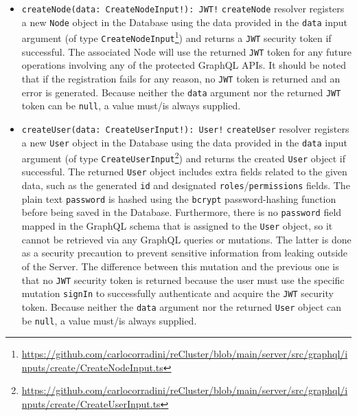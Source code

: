 \begin{itemize}
  \item \lstinline[language=graphql, morekeywords={[2]{CreateNodeInput, JWT}}, morekeywords={[4]{data}},
    morekeywords={[5]{createNode}}]{createNode(data: CreateNodeInput!): JWT!}
    \newline
    \texttt{createNode} resolver registers a new \texttt{Node} object in the
    Database using the data provided in the \texttt{data} input argument (of
    type \texttt{CreateNodeInput}\footnote{\url{https://github.com/carlocorradini/reCluster/blob/main/server/src/graphql/inputs/create/CreateNodeInput.ts}})
    and returns a \texttt{JWT} security token if successful.
    \newline
    The associated Node will use the returned \texttt{JWT} token for any future operations
    involving any of the protected GraphQL APIs.
    \newline
    It should be noted that if the registration fails for any reason, no \texttt{JWT}
    token is returned and an error is generated.
    \newline
    Because neither the \texttt{data} argument nor the returned \texttt{JWT} token
    can be \texttt{null}, a value must/is always supplied.

  \item \lstinline[language=graphql, morekeywords={[2]{CreateUserInput, User}}, morekeywords={[4]{data}},
    morekeywords={[5]{createUser}}]{createUser(data: CreateUserInput!): User!}
    \newline
    \texttt{createUser} resolver registers a new \texttt{User} object in the
    Database using the data provided in the \texttt{data} input argument (of
    type \texttt{CreateUserInput}\footnote{\url{https://github.com/carlocorradini/reCluster/blob/main/server/src/graphql/inputs/create/CreateUserInput.ts}})
    and returns the created \texttt{User} object if successful.
    \newline
    The returned \texttt{User} object includes extra fields related to the given
    data, such as the generated \texttt{id} and designated \texttt{roles}/\texttt{permissions}
    fields.
    \newline
    The plain text \texttt{password} is hashed using the \texttt{bcrypt}
    password-hashing function before being saved in the Database. Furthermore,
    there is no \texttt{password} field mapped in the GraphQL schema that is assigned
    to the \texttt{User} object, so it cannot be retrieved via any GraphQL queries
    or mutations. The latter is done as a security precaution to prevent
    sensitive information from leaking outside of the Server.
    \newline
    The difference between this mutation and the previous one is that no \texttt{JWT}
    security token is returned because the user must use the specific mutation
    \texttt{signIn} to successfully authenticate and acquire the \texttt{JWT}
    security token.
    \newline
    Because neither the \texttt{data} argument nor the returned \texttt{User} object
    can be \texttt{null}, a value must/is always supplied.


\end{itemize}
